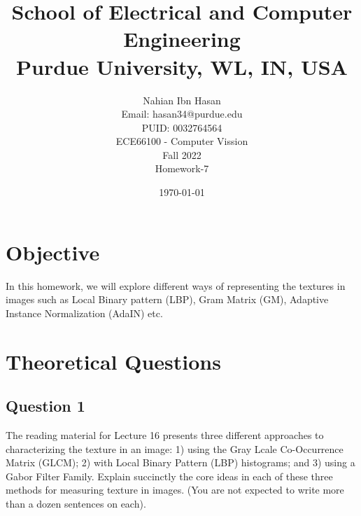 \documentclass{article}
\title{School of Electrical and Computer Engineering\\
Purdue University, WL, IN, USA}
\author{Nahian Ibn Hasan\\
Email: hasan34@purdue.edu\\
PUID: 0032764564\\
ECE66100 - Computer Vission\\
Fall 2022\\
Homework-7}
\date{\today}
\begin{document}
\maketitle
\section{Objective}
In this homework, we will explore different ways of representing the textures in images such as Local Binary pattern (LBP), Gram Matrix (GM), Adaptive Instance Normalization (AdaIN) etc.
\section{Theoretical Questions}
\subsection{Question 1}
The reading material for Lecture 16 presents three different approaches to characterizing the texture in an image: 1) using the Gray Lcale Co-Occurrence Matrix (GLCM); 2) with Local Binary Pattern (LBP) histograms; and 3) using a Gabor Filter Family. Explain succinctly the core ideas in each of these three methods for measuring texture in images. (You are not expected to write more than a dozen sentences on each).
\end{document}
